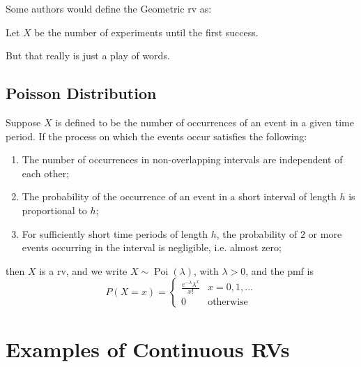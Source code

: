 \documentclass[notoc,notitlepage]{tufte-book}
\DeclareMathOperator{\Poi}{Poi }
\begin{document}
\begin{note}
  Some authors would define the Geometric rv as:

  Let $X$ be the number of experiments until the first success.

  But that really is just a play of words.
\end{note}


\subsection{Poisson Distribution}
\label{sub:poisson_distribution}

\begin{defn}[Poisson RV]\label{defn:poisson_rv}
  Suppose $X$ is defined to be the number of occurrences of an event in a given time period. If the process on which the events occur satisfies the following:
  \begin{enumerate}
    \item The number of occurrences in non-overlapping intervals are independent of each other;
    \item The probability of the occurrence of an event in a short interval of length $h$ is proportional to $h$;
    \item For sufficiently short time periods of length $h$, the probability of $2$ or more events occurring in the interval is negligible, i.e. almost zero;
  \end{enumerate}
  then $X$ is a  rv, and we write $X \sim \Poi(\lambda)$, with $\lambda > 0$, and the pmf is
  \begin{equation*}
    P(X = x) = \begin{cases} 
      \frac{e^{- \lambda} \lambda^x}{x!} & x = 0, 1, ... \\
      0                                  & \text{otherwise}
    \end{cases}
  \end{equation*}
\end{defn}



\section{Examples of Continuous RVs}
\label{sec:examples_of_continuous_rvs}
\end{document}
